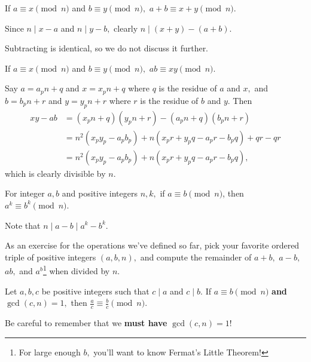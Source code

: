 \documentclass[mast]{lucky}
\begin{document}
\begin{fact}[Adding]
If $a \equiv x\pmod{n}$ and $b\equiv y\pmod{n},$ $a+b\equiv x+y\pmod{n}.$
\end{fact}

\begin{pro}
Since $n\mid x-a$ and $n\mid y-b,$ clearly $n\mid(x+y)-(a+b).$
\end{pro}

Subtracting is identical, so we do not discuss it further.

\begin{fact}[Multiplying]
If $a \equiv x\pmod{n}$ and $b\equiv y\pmod{n},$ $ab\equiv xy\pmod{n}.$
\end{fact}

\begin{pro}
Say $a=a_pn+q$ and $x=x_pn+q$ where $q$ is the residue of $a$ and $x,$ and $b=b_pn+r$ and $y=y_pn+r$ where $r$ is the residue of $b$ and $y.$ Then
\begin{align*}
xy-ab&=(x_pn+q)(y_pn+r)-(a_pn+q)(b_pn+r)\\
&=n^2(x_py_p-a_pb_p)+n(x_pr+y_pq-a_pr-b_pq)+qr-qr\\
&=n^2(x_py_p-a_pb_p)+n(x_pr+y_pq-a_pr-b_pq),
\end{align*}
which is clearly divisible by $n.$
\end{pro}

\begin{fact}[Exponentiating]
For integer $a,b$ and positive integers $n,k,$ if $a \equiv b\pmod{n}$, then $a^k \equiv b^k \pmod{n}$.
\end{fact}

\begin{pro}
Note that $n\mid a-b\mid a^k-b^k.$
\end{pro}

As an exercise for the operations we've defined so far, pick your favorite ordered triple of positive integers $(a,b,n),$ and compute the remainder of $a+b,$ $a-b,$ $ab,$ and $a^b$\footnote{For large enough $b,$ you'll want to know Fermat's Little Theorem!} when divided by $n.$

\begin{fact}[Dividing]
Let $a,b,c$ be positive integers such that $c\mid a$ and $c\mid b.$ If $a\equiv b\pmod{n}$ \textbf{and} $\gcd(c,n)=1,$ then $\frac{a}{c}\equiv\frac{b}{c}\pmod{n}.$
\end{fact}

Be careful to remember that we \textbf{must have} $\gcd(c,n)=1$!
\end{document}
